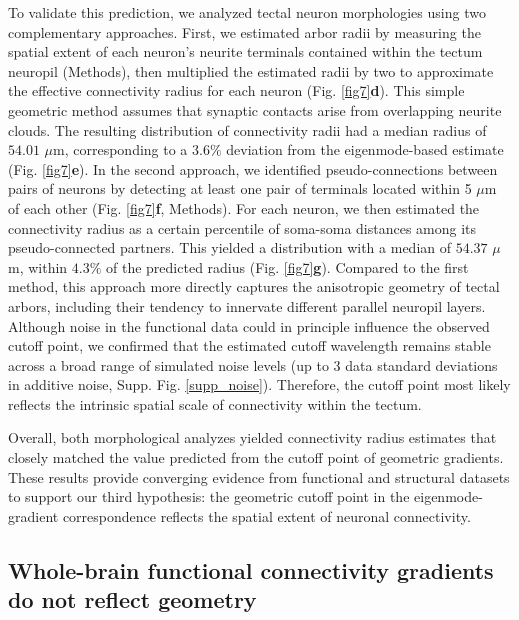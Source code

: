 \documentclass{article}
\begin{document}
To validate this prediction, we analyzed tectal neuron morphologies using two complementary approaches. First, we estimated arbor radii by measuring the spatial extent of each neuron's neurite terminals contained within the tectum neuropil (Methods), then multiplied the estimated radii by two to approximate the effective connectivity radius for each neuron (Fig. \ref{fig7}\textbf{d}). This simple geometric method assumes that synaptic contacts arise from overlapping neurite clouds. The resulting distribution of connectivity radii had a median radius of $54.01$ $\mu$m, corresponding to a $3.6\%$ deviation from the eigenmode-based estimate (Fig. \ref{fig7}\textbf{e}). In the second approach, we identified pseudo-connections between pairs of neurons by detecting at least one pair of terminals located within 5 $\mu$m of each other (Fig. \ref{fig7}\textbf{f}, Methods). For each neuron, we then estimated the connectivity radius as a certain percentile of soma-soma distances among its pseudo-connected partners. This yielded a distribution with a median of $54.37$ $\mu$m, within $4.3\%$ of the predicted radius (Fig. \ref{fig7}\textbf{g}). Compared to the first method, this approach more directly captures the anisotropic geometry of tectal arbors, including their tendency to innervate different parallel neuropil layers. Although noise in the functional data could in principle influence the observed cutoff point, we confirmed that the estimated cutoff wavelength remains stable across a broad range of simulated noise levels (up to 3 data standard deviations in additive noise, Supp. Fig. \ref{supp_noise}). Therefore, the cutoff point most likely reflects the intrinsic spatial scale of connectivity within the tectum.

Overall, both morphological analyzes yielded connectivity radius estimates that closely matched the value predicted from the cutoff point of geometric gradients. These results provide converging evidence from functional and structural datasets to support our third hypothesis: the geometric cutoff point in the eigenmode-gradient correspondence reflects the spatial extent of neuronal connectivity.

\subsection*{Whole-brain functional connectivity gradients do not reflect geometry}
\end{document}
